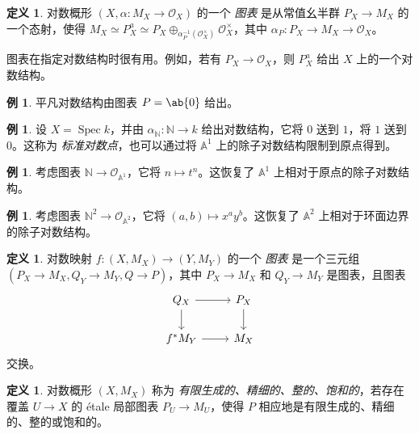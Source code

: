 \documentclass{amsart}
\theoremstyle{definition}
\newtheorem{defn}[thm]{定义}
\newtheorem{exm}[thm]{例}
\theoremstyle{remark}
\theoremstyle{plain}
\theoremstyle{definition}
\theoremstyle{remark}
\newcommand{\A}{\mathbb{A}}
\newcommand{\N}{\mathbb{N}}
\newcommand{\mc}[1]{\mathcal{#1}}
\newcommand{\1}{\mathbf{1}}
\newcommand{\2}{\mathbf{2}}
\newcommand{\3}{\mathbf{3}}
\DeclareMathOperator{\Spec}{Spec}
\begin{document}
\begin{defn}
    对数概形 \((X, \alpha \colon M_X \to \mc{O}_X)\) 的一个 \textit{图表} 是从常值幺半群 \(P_X \to M_X\) 的一个态射，使得 \(M_X \simeq P_X^a \simeq P_X \oplus_{\alpha_P^{-1}(\mc{O}_X^{\times})} \mc{O}_X^{\times}\)，其中 \(\alpha_P \colon P_X \to M_X \to \mc{O}_X\)。
\end{defn}

图表在指定对数结构时很有用。例如，若有 \(P_X \to \mc{O}_X\)，则 \(P_X^a\) 给出 \(X\) 上的一个对数结构。

\begin{exm}
    平凡对数结构由图表 \(P = \ab\{0\}\) 给出。
\end{exm}

\begin{exm}
    设 \(X = \Spec k\)，并由 \(\alpha_{\N} \colon \N \to k\) 给出对数结构，它将 \(0\) 送到 \(1\)，将 \(1\) 送到 \(0\)。这称为 \textit{标准对数点}，也可以通过将 \(\A^1\) 上的除子对数结构限制到原点得到。
\end{exm}

\begin{exm}
    考虑图表 \(\N \to \mc{O}_{\A^1}\)，它将 \(n \mapsto t^n\)。这恢复了 \(\A^1\) 上相对于原点的除子对数结构。
\end{exm}

\begin{exm}
    考虑图表 \(\N^2 \to \mc{O}_{\A^2}\)，它将 \((a,b) \mapsto x^a y^b\)。这恢复了 \(\A^2\) 上相对于环面边界的除子对数结构。
\end{exm}

\begin{defn}
    对数映射 \(f \colon (X, M_X) \to (Y, M_Y)\) 的一个 \textit{图表} 是一个三元组 \((P_X\to M_X, Q_Y \to M_Y, Q \to P)\)，其中 \(P_X \to M_X\) 和 \(Q_Y \to M_Y\) 是图表，且图表
    \begin{equation*}
    \begin{tikzcd}
        Q_X \ar{r} \ar{d} & P_X \ar{d} \\
        f^* M_Y \ar{r} & M_X
    \end{tikzcd}
    \end{equation*}
    交换。
\end{defn}

\begin{defn}
    对数概形 \((X, M_X)\) 称为 \textit{有限生成的、精细的、整的、饱和的}，若存在覆盖 \(U \to X\) 的 \'etale 局部图表 \(P_U \to M_U\)，使得 \(P\) 相应地是有限生成的、精细的、整的或饱和的。
\end{defn}
\end{document}
